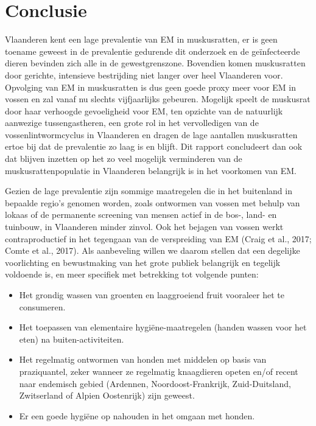\documentclass[twoside]{extreport}
\begin{document}
\chapter{Conclusie}\label{conclusie}

Vlaanderen kent een lage prevalentie van EM in muskusratten, er is geen
toename geweest in de prevalentie gedurende dit onderzoek en de
geïnfecteerde dieren bevinden zich alle in de gewestgrenszone. Bovendien
komen muskusratten door gerichte, intensieve bestrijding niet langer
over heel Vlaanderen voor. Opvolging van EM in muskusratten is dus geen
goede proxy meer voor EM in vossen en zal vanaf nu slechts vijfjaarlijks
gebeuren. Mogelijk speelt de muskusrat door haar verhoogde gevoeligheid
voor EM, ten opzichte van de natuurlijk aanwezige tussengastheren, een
grote rol in het vervolledigen van de vossenlintwormcyclus in Vlaanderen
en dragen de lage aantallen muskusratten ertoe bij dat de prevalentie zo
laag is en blijft. Dit rapport concludeert dan ook dat blijven inzetten
op het zo veel mogelijk verminderen van de muskusrattenpopulatie in
Vlaanderen belangrijk is in het voorkomen van EM.

Gezien de lage prevalentie zijn sommige maatregelen die in het
buitenland in bepaalde regio's genomen worden, zoals ontwormen van
vossen met behulp van lokaas of de permanente screening van mensen
actief in de bos-, land- en tuinbouw, in Vlaanderen minder zinvol. Ook
het bejagen van vossen werkt contraproductief in het tegengaan van de
verspreiding van EM (Craig et al., 2017; Comte et al., 2017). Als
aanbeveling willen we daarom stellen dat een degelijke voorlichting en
bewustmaking van het grote publiek belangrijk en tegelijk voldoende is,
en meer specifiek met betrekking tot volgende punten:

\begin{itemize}
\tightlist
\item
  Het grondig wassen van groenten en laaggroeiend fruit vooraleer het te
  consumeren.
\item
  Het toepassen van elementaire hygiëne-maatregelen (handen wassen voor
  het eten) na buiten-activiteiten.
\item
  Het regelmatig ontwormen van honden met middelen op basis van
  praziquantel, zeker wanneer ze regelmatig knaagdieren opeten en/of
  recent naar endemisch gebied (Ardennen, Noordoost-Frankrijk,
  Zuid-Duitsland, Zwitserland of Alpien Oostenrijk) zijn geweest.
\item
  Er een goede hygiëne op nahouden in het omgaan met honden.
\end{itemize}

\cleardoublepage


\end{document}
